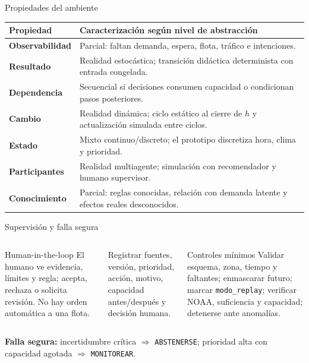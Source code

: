 \documentclass[aspectratio=169,11pt]{beamer}
\newcommand{\concepto}[1]{\textcolor{UAPTeal}{\textbf{#1}}}
\newcommand{\accion}[1]{\texttt{#1}}
\begin{document}
\begin{frame}{Propiedades del ambiente}
  \scriptsize
  \begin{tabularx}{\textwidth}{>{\bfseries}p{}X}
    \toprule
    Propiedad & Caracterización según nivel de abstracción \\\midrule
    Observabilidad & Parcial: faltan demanda, espera, flota, tráfico e intenciones. \\
    Resultado & Realidad estocástica; transición didáctica determinista con entrada congelada. \\
    Dependencia & Secuencial si decisiones consumen capacidad o condicionan pasos posteriores. \\
    Cambio & Realidad dinámica; ciclo estático al cierre de $h$ y actualización simulada entre ciclos. \\
    Estado & Mixto continuo/discreto; el prototipo discretiza hora, clima y prioridad. \\
    Participantes & Realidad multiagente; simulación con recomendador y humano supervisor. \\
    Conocimiento & Parcial: reglas conocidas, relación con demanda latente y efectos reales desconocidos. \\
    \bottomrule
  \end{tabularx}
\end{frame}

\begin{frame}{Supervisión y falla segura}
  \begin{columns}[T]
      \begin{block}{Human-in-the-loop}
        El humano ve evidencia, límites y regla; acepta, rechaza o solicita revisión. No hay orden automática a una flota.
      \end{block}
      Registrar fuentes, versión, prioridad, acción, motivo, capacidad antes/después y decisión humana.
      \begin{alertblock}{Controles mínimos}
        Validar esquema, zona, tiempo y faltantes; enmascarar futuro; marcar \texttt{modo\_replay}; verificar NOAA, suficiencia y capacidad; detenerse ante anomalías.
      \end{alertblock}
  \end{columns}
  \vfill
  \concepto{Falla segura:} incertidumbre crítica $\Rightarrow$ \accion{ABSTENERSE}; prioridad alta con capacidad agotada $\Rightarrow$ \accion{MONITOREAR}.
\end{frame}
\end{document}
